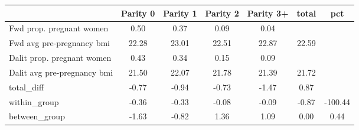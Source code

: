 \begin{tabular}{l*{6}{c}}
\toprule
            &\multicolumn{1}{c}{Parity 0}&\multicolumn{1}{c}{Parity 1}&\multicolumn{1}{c}{Parity 2}&\multicolumn{1}{c}{Parity 3+}&\multicolumn{1}{c}{total}&\multicolumn{1}{c}{pct}\\
\midrule
\midrule
Fwd prop. pregnant women&        0.50&        0.37&        0.09&        0.04&            &            \\
Fwd avg pre-pregnancy bmi&       22.28&       23.01&       22.51&       22.87&       22.59&            \\
Dalit prop. pregnant women&        0.43&        0.34&        0.15&        0.09&            &            \\
Dalit avg pre-pregnancy bmi&       21.50&       22.07&       21.78&       21.39&       21.72&            \\
total\_diff  &       -0.77&       -0.94&       -0.73&       -1.47&        0.87&            \\
within\_group&       -0.36&       -0.33&       -0.08&       -0.09&       -0.87&     -100.44\\
between\_group&       -1.63&       -0.82&        1.36&        1.09&        0.00&        0.44\\
\bottomrule
\end{tabular}
